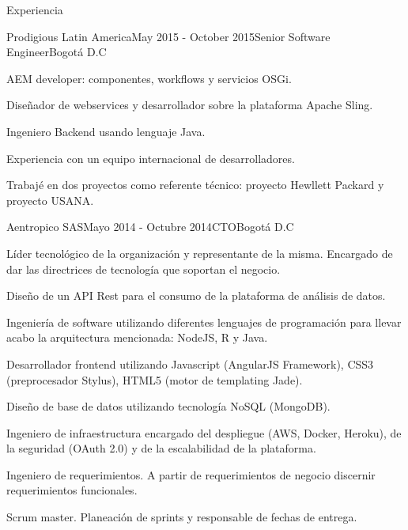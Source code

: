 \documentclass[spanish]{resume} %
\begin{document}
\begin{rSection}{Experiencia}

\begin{rSubsection}{Prodigious Latin America}{May 2015 - October 2015}{Senior Software Engineer}{Bogot\'a D.C}
\item AEM developer: componentes, workflows y servicios OSGi.
\item Diseñador de webservices y desarrollador sobre la plataforma Apache Sling.  
\item Ingeniero Backend usando lenguaje Java.
\item Experiencia con un equipo internacional de desarrolladores.
\item Trabajé en dos proyectos como referente técnico: proyecto Hewllett Packard y proyecto USANA.
\end{rSubsection}


\begin{rSubsection}{Aentropico SAS}{Mayo 2014 - Octubre 2014}{CTO}{Bogot\'a D.C}
\item L\'ider tecnol\'ogico de la organizaci\'on y representante de la misma. Encargado de dar las directrices de tecnolog\'ia que soportan el negocio.
\item Dise\~no de un API Rest para el consumo de la plataforma de an\'alisis de datos.
\item Ingenier\'ia de software utilizando diferentes lenguajes de programaci\'on para llevar acabo la arquitectura mencionada: NodeJS, R y Java.
\item Desarrollador frontend utilizando Javascript (AngularJS Framework), CSS3 (preprocesador Stylus), HTML5 (motor de templating Jade).
\item Dise\~no de base de datos utilizando tecnolog\'ia NoSQL (MongoDB).
\item Ingeniero de infraestructura encargado del despliegue (AWS, Docker, Heroku), de la seguridad (OAuth 2.0) y de la escalabilidad de la plataforma.
\item Ingeniero de requerimientos. A partir de requerimientos de negocio discernir requerimientos funcionales.
\item Scrum master. Planeaci\'on de sprints y responsable de fechas de entrega.
\end{rSubsection}


\end{rSection}
\end{document}

